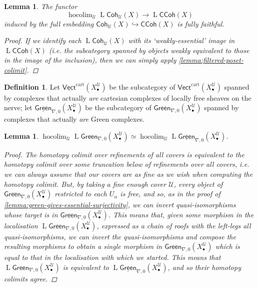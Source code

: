\documentclass[11pt,fleqn]{article}
\theoremstyle{plain}
\newtheorem{lemma}[theorem]{Lemma}
\theoremstyle{definition}
\newtheorem{definition}[theorem]{Definition}
\theoremstyle{remark}
\numberwithin{equation}{theorem}
\newcommand{\cover}{\mathcal{U}}
\newcommand{\gcohUX}{\mathsf{Coh}_{\cover}(X)}
\newcommand{\gccohX}{\mathsf{CCoh}(X)}
\newcommand{\cartvectX}{\mathsf{Vect}^\mathrm{cart}(X_\bullet^\cover)}
\newcommand{\greenzeroX}{\mathsf{Green}_{\nabla,0}(X_\bullet^\cover)}
\newcommand{\scartvectX}{\underline{\mathsf{Vect}}^\mathrm{cart}(X_\bullet^\cover)}
\newcommand{\sgreenzeroX}{\underline{\mathsf{Green}}_{\nabla,0}(X_\bullet^\cover)}
\DeclareMathOperator{\LL}{L}
\DeclareMathOperator{\hocolim}{hocolim}
\begin{document}
        \begin{lemma}\label{lemma:gcohUX-to-gccohX-fully-faithful}
            The functor
            \[
                \hocolim_\cover\LL{\gcohUX}\to\LL{\gccohX}
            \]
            induced by the full embedding $\gcohUX\hookrightarrow\gccohX$ is fully faithful.

            \begin{proof}
                If we identify each $\LL{\gcohUX}$ with its `weakly-essential' image in $\LL{\gccohX}$ (i.e. the subcategory spanned by objects \emph{weakly equivalent} to those in the image of the inclusion), then we can simply apply \cref{lemma:filtered-poset-colimit}.
            \end{proof}
        \end{lemma}

        \begin{definition}
            Let $\scartvectX$ be the subcategory of $\cartvectX$ spanned by complexes that actually \emph{are} cartesian complexes of locally free sheaves on the nerve; let $\sgreenzeroX$ be the subcategory of $\greenzeroX$ spanned by complexes that actually \emph{are} Green complexes.
        \end{definition}

        \begin{lemma}\label{lemma:can-sort-of-strictify-vect-and-green}
            $\hocolim_\cover\LL{\greenzeroX} \simeq \hocolim_\cover\LL{\sgreenzeroX}$.
            
            \begin{proof}
                The homotopy colimit over refinements of all covers is equivalent to the homotopy colimit over some truncation below of refinements over all covers, i.e. we can always assume that our covers are as fine as we wish when computing the homotopy colimit.
                But, by taking a fine enough cover $\cover$, every object of $\greenzeroX$ restricted to each $U_\alpha$ is free, and so, as in the proof of \cref{lemma:green-gives-essential-surjectivity}, we can invert quasi-isomorphisms whose target is in $\greenzeroX$.
                This means that, given some morphism in the localisation $\LL{\greenzeroX}$, expressed as a chain of roofs with the left-legs all quasi-isomorphisms, we can invert the quasi-isomorphisms and compose the resulting morphisms to obtain a single morphism in $\greenzeroX$ which is equal to that in the localisation with which we started.
                This means that $\LL{\greenzeroX}$ is equivalent to $\LL{\sgreenzeroX}$, and so their homotopy colimits agree.
            \end{proof}
        \end{lemma}
\end{document}
